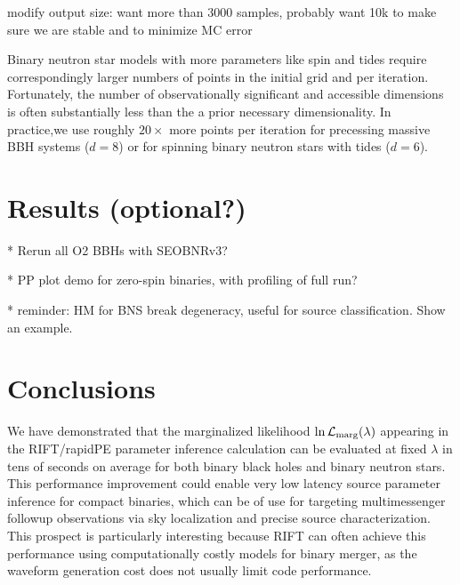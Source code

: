 \documentclass[twocolumn,prd,nofootinbib]{revtex4}
\newcommand\editremark[1]{{\color{red} #1}}
\begin{document}
\editremark{modify output size: want more than 3000 samples, probably want 10k to make sure we are stable and to
  minimize MC error}






Binary neutron star models with more parameters like spin and tides require correspondingly larger numbers of points in the
  initial grid and per iteration.  Fortunately, the number of observationally significant and accessible dimensions is often
  substantially less than the a prior necessary dimensionality.  In practice,we use roughly $20\times$ more points per
  iteration for precessing massive BBH systems ($d=8$) or for spinning binary neutron stars with tides ($d=6$).  

\section{ Results (optional?)}

*   Rerun all O2 BBHs with SEOBNRv3?  

* PP plot demo for zero-spin binaries, with profiling of full run?  

* reminder: HM for BNS break degeneracy, useful for source classification.  Show an example.

\section{Conclusions}
\label{sec:conclude}
We have demonstrated that the marginalized likelihood $\ln {\cal L}_{\rm marg}(\lambda)$ appearing in the RIFT/rapidPE parameter
inference calculation can be evaluated at fixed $\lambda$ in tens of seconds on average for
both binary black holes and binary neutron stars.  This performance improvement could enable very low latency source
parameter inference for compact binaries, which can be of use for targeting multimessenger followup observations via sky
localization and  precise source characterization.     This prospect is particularly interesting because RIFT can
often achieve this performance using computationally costly models for binary merger, as the waveform generation cost
does not usually limit code performance.   
\end{document}
